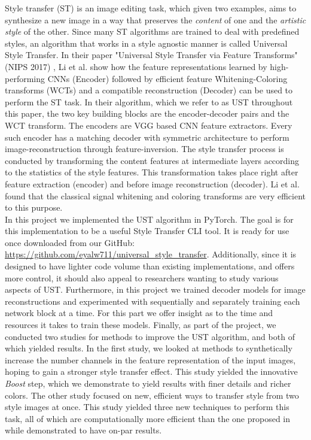 \hspace{0.5cm} Style transfer (ST) is an image editing task, which given two examples, aims to synthesize a new image in a way that preserves the \textit{content} of one and the \textit{artistic style} of the other. Since many ST algorithms are trained to deal with predefined styles, an algorithm that works in a style agnostic manner is called Universal Style Transfer.
In their paper "Universal Style Transfer via Feature Transforms" (NIPS 2017) \cite{bib11}, Li et al. show how the feature representations learned by high-performing CNNs (Encoder) followed by efficient feature Whitening-Coloring transforms (WCTs) and a compatible reconstruction (Decoder) can be used to perform the ST task. In their algorithm, which we refer to as UST throughout this paper, the two key building blocks are the encoder-decoder pairs and the WCT transform. The encoders are VGG based CNN feature extractors. Every such encoder has a matching decoder with symmetric architecture to perform image-reconstruction through feature-inversion. The style transfer process is conducted by transforming the content features at intermediate layers according to the statistics of the style features. This transformation takes place right after feature extraction (encoder) and before image reconstruction (decoder). Li et al. found that the classical signal whitening and coloring transforms are very efficient to this purpose.\\
In this project we implemented the UST algorithm in PyTorch. The goal is for this implementation to be a useful Style Transfer CLI tool. It is ready for use once downloaded from our GitHub: \url{https://github.com/eyalw711/universal_style_transfer}. Additionally, since it is designed to have lighter code volume than existing implementations, and offers more control, it should also appeal to researchers wanting to study various aspects of UST. Furthermore, in this project we trained decoder models for image reconstructions and experimented with sequentially and separately training each network block at a time. For this part we offer insight as to the time and resources it takes to train these models. Finally, as part of the project, we conducted two studies for methods to improve the UST algorithm, and both of which yielded results. In the first study, we looked at methods to synthetically increase the number channels in the feature representation of the input images, hoping to gain a stronger style transfer effect. This study yielded the innovative \textit{Boost} step, which we demonstrate to yield results with finer details and richer colors. The other study focused on new, efficient ways to transfer style from two style images at once. This study yielded three new techniques to perform this task, all of which are computationally more efficient than the one proposed in \cite{bib11} while demonstrated to have on-par results. \\


